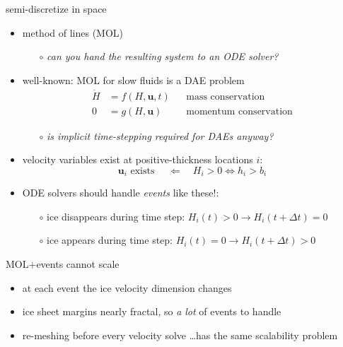 \documentclass[hide notes,intlimits,usenames,dvipsnames]{beamer}
\begin{document}
\begin{frame}{semi-discretize in space}

\begin{itemize}
\item method of lines (MOL)
    \begin{itemize}
    \item[$\circ$] \emph{can you hand the resulting system to an ODE solver?}
    \end{itemize}
\item well-known: MOL for slow fluids is a DAE problem
\begin{align*}
\dot H &= f(H,\mathbf{u},t) && \text{mass conservation} \\
     0 &= g(H,\mathbf{u})   && \text{momentum conservation}
\end{align*}
\vspace{-5mm}
    \begin{itemize}
    \item[$\circ$] \emph{is implicit time-stepping required for DAEs anyway?}
    \end{itemize}
\item velocity variables exist at positive-thickness locations $i$:
    $$\mathbf{u}_i \text{ exists } \quad \Longleftarrow \quad H_i > 0 \iff h_i > b_i$$
\item ODE solvers should handle \emph{events} like these!:
    \begin{itemize}
    \item[$\circ$] ice disappears during time step:  $H_i(t)>0 \to H_i(t+\Delta t)=0$
    \item[$\circ$] ice appears during time step:  $H_i(t)=0 \to H_i(t+\Delta t)>0$
    \end{itemize}
\end{itemize}
\end{frame}


\begin{frame}{MOL$+$events cannot scale}

\begin{center}

\end{center}

\vspace{-6mm}
\begin{itemize}
\item at each event the ice velocity dimension changes
\item ice sheet margins nearly fractal, so \emph{a lot} of events to handle
\item re-meshing before every velocity solve \dots has the same scalability problem
\end{itemize}
\end{frame}
\end{document}
